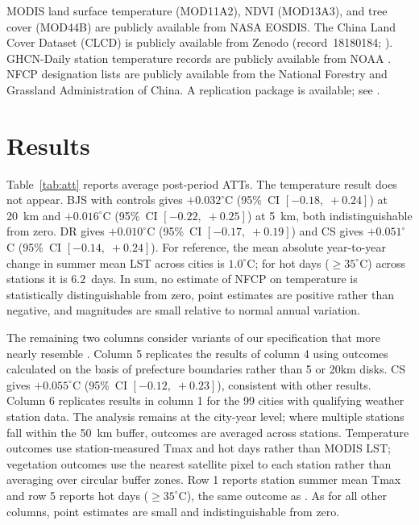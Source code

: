 \documentclass[12pt]{article}
\begin{document}
MODIS land surface temperature (MOD11A2), NDVI (MOD13A3), and tree cover
(MOD44B) are publicly available from NASA EOSDIS.
The China Land Cover Dataset (CLCD) is publicly available from Zenodo
(record~18180184; \citealt{Yang2021}).
GHCN-Daily station temperature records are publicly available from NOAA
\citep{Menne2012}.
NFCP designation lists are publicly available from the National Forestry
and Grassland Administration of China.
A replication package is available; see \citet{Turner2026replication}.

\section{Results}
\label{sec:results}

Table~\ref{tab:att} reports average post-period ATTs.  The \citet{Ma2026}
temperature result does not appear. BJS with controls gives $+0.032^\circ$C (95\%~CI $[-0.18,\;+0.24]$) at 20~km and $+0.016^\circ$C (95\%~CI $[-0.22,\;+0.25]$) at 5~km, both indistinguishable from zero.
DR gives $+0.010^\circ$C (95\%~CI $[-0.17,\;+0.19]$) and CS gives $+0.051^\circ$C (95\%~CI $[-0.14,\;+0.24]$). For reference, the mean absolute year-to-year change in summer mean LST across cities is $1.0^\circ$C; for hot days ($\geq 35^\circ$C) across stations it is $6.2$~days. In sum, no estimate of NFCP on temperature is statistically distinguishable from zero, point estimates are positive rather than negative, and magnitudes are small relative to normal annual variation.

The remaining two columns consider variants of our specification that more nearly resemble \citet{Ma2026}. Column 5 replicates the results of column 4 using outcomes calculated on the basis of prefecture boundaries rather than 5 or 20km disks.  CS gives $+0.055^\circ$C (95\%~CI $[-0.12,\;+0.23]$), consistent with other results. Column 6 replicates results in column 1 for the 99 cities with qualifying weather station data.  The analysis remains at the city-year level; where multiple stations fall within the 50~km buffer, outcomes are averaged across stations.  Temperature outcomes use station-measured Tmax and hot days rather than MODIS LST; vegetation outcomes use the nearest satellite pixel to each station rather than averaging over circular buffer zones.  Row 1 reports station summer mean Tmax and row 5 reports hot days ($\geq 35^\circ$C), the same outcome as \citet{Ma2026}.  As for all other columns, point estimates are small and indistinguishable from zero.
\end{document}
